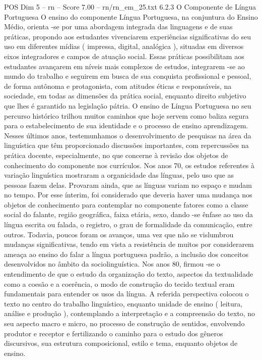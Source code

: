 \begin{textsample}{POS Dim 5 – rn – Score 7.00 – rn/rn\_em\_25.txt}  \label{ex:f5_pos_142}
6.2.3 O Componente de Língua Portuguesa O ensino do componente Língua Portuguesa, na conjuntura do Ensino Médio, orienta -se por uma abordagem integrada das linguagens e de suas práticas, propondo aos estudantes vivenciarem experiências significativas do seu uso em diferentes mídias ( impressa, digital, analógica ), situadas em diversos eixos integradores e campos de atuação social.
Essas práticas possibilitam aos estudantes avançarem em níveis mais complexos de estudos, integrarem -se ao mundo do trabalho e seguirem em busca de sua conquista profissional e pessoal, de forma autônoma e protagonista, com atitudes éticas e responsáveis, na sociedade, em todas as dimensões da prática social, enquanto direito subjetivo que lhes é garantido na legislação pátria.
O ensino de Língua Portuguesa no seu percurso histórico trilhou muitos caminhos que hoje servem como baliza segura para o estabelecimento de sua identidade e o processo de ensino aprendizagem.
Nesses últimos anos, testemunhamos o desenvolvimento de pesquisas na área da linguística que têm proporcionado discussões importantes, com repercussões na prática docente, especialmente, no que concerne à revisão dos objetos de conhecimento do componente nos currículos.
Nos anos 70, os estudos referentes à variação linguística mostraram a organicidade das línguas, pelo uso que as pessoas fazem delas.
Provaram ainda, que as línguas variam no espaço e mudam no tempo.
Por esse ínterim, foi considerado que deveria haver uma mudança nos objetos de conhecimento para contemplar no componente fatores como a classe social do falante, região geográfica, faixa etária, sexo, dando -se ênfase ao uso da língua escrita ou falada, o registro, o grau de formalidade da comunicação, entre outros.
Todavia, poucos foram os avanços, uma vez que não se vislumbrou mudanças significativas, tendo em vista a resistência de muitos por considerarem ameaça ao ensino do falar a língua portuguesa padrão, a inclusão dos conceitos desenvolvidos no âmbito da sociolinguística.
Nos anos 80, firmou -se o entendimento de que o estudo da organização do texto, aspectos da textualidade como a coesão e a coerência, o modo de construção do tecido textual eram fundamentais para entender os usos da língua.
A referida perspectiva colocou o texto no centro do trabalho linguístico, enquanto unidade de ensino ( leitura, análise e produção ), contemplando a interpretação e a compreensão do texto, no seu aspecto macro e micro, no processo de construção de sentidos, envolvendo produtor e receptor e fertilizando o caminho para o estudo dos gêneros discursivos, sua estrutura composicional, estilo e tema, enquanto objetos de ensino.

\end{textsample}
